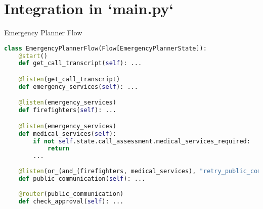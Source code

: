 \section{Integration in `main.py`}
\begin{frame}[fragile]{Emergency Planner Flow}
    \begin{lstlisting}[language=Python]
class EmergencyPlannerFlow(Flow[EmergencyPlannerState]):
    @start()
    def get_call_transcript(self): ...

    @listen(get_call_transcript)
    def emergency_services(self): ...

    @listen(emergency_services)
    def firefighters(self): ...

    @listen(emergency_services)
    def medical_services(self):
        if not self.state.call_assessment.medical_services_required:
            return
        ...
    
    @listen(or_(and_(firefighters, medical_services), "retry_public_communication"))
    def public_communication(self): ...
    
    @router(public_communication)
    def check_approval(self): ...
\end{lstlisting}
\end{frame}